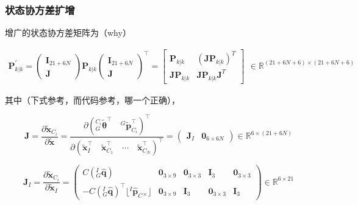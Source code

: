 \documentclass[12pt,a4paper]{article}
\begin{document}
\subsubsection{状态协方差扩增}

增广的状态协方差矩阵为（{\color{red}why}）

\begin{equation}
\begin{aligned}
\mathbf{P}_{k|k}^{\prime}
= 
\begin{pmatrix}
\mathbf{I}_{21+6N} \\ \mathbf{J}
\end{pmatrix}
\mathbf{P}_{k|k}
\begin{pmatrix}
\mathbf{I}_{21+6N} \\ \mathbf{J}
\end{pmatrix}^\top 
=
\begin{bmatrix}
\mathbf{P}_{k|k} & (\mathbf{J} \mathbf{P}_{k|k})^T \\
\mathbf{J} \mathbf{P}_{k|k} & \mathbf{J} \mathbf{P}_{k|k} \mathbf{J}^T
\end{bmatrix}
\end{aligned}
\in \mathbb{R}^{(21+6N+6) \times (21+6N+6)}
\end{equation}

其中（下式参考\citep{sun2018robust}，而代码参考\cite{mourikis2007multi}，{\color{red}哪一个正确}），

\begin{equation*}
\mathbf{J} = 
\frac{\partial{\tilde{\mathbf{x}}_{C_i}}}{\partial{\tilde{\mathbf{x}}}} = 
\frac{
\partial{\left(
{}^{C_i}_G\tilde{\boldsymbol{\theta}}^\top \quad
{}^G\tilde{\mathbf{p}}_{C_i}^\top
\right)^\top}}
{\partial{\left(
\tilde{\mathbf{x}}_I^\top \quad
\tilde{\mathbf{x}}_{C_1}^\top \quad
\cdots \quad 
\tilde{\mathbf{x}}_{C_N}^\top
\right)^\top}} = 
\begin{pmatrix}
\mathbf{J}_I & \mathbf{0}_{6\times 6N}
\end{pmatrix}
\in \mathbb{R}^{6 \times (21+6N)}
\end{equation*}

\begin{equation*}
\mathbf{J}_I = 
\frac{\partial{\tilde{\mathbf{x}}_{C_i}}}{\partial{\tilde{\mathbf{x}}_I}} = 
\begin{pmatrix}
C\left({}^I_G\hat{\mathbf{q}}\right) & \mathbf{0}_{3\times 9} & 
\mathbf{0}_{3\times 3} & \mathbf{I}_3 & \mathbf{0}_{3\times 3} \\
-C\left({}^I_G\hat{\mathbf{q}}\right)^\top \lfloor{}^I\hat{\mathbf{p}}_C {}_{\times}\rfloor & 
\mathbf{0}_{3\times 9} & \mathbf{I}_3 & \mathbf{0}_{3\times 3} & 
\mathbf{I}_{3}
\end{pmatrix}
\in \mathbb{R}^{6 \times 21}
\end{equation*}
\end{document}
